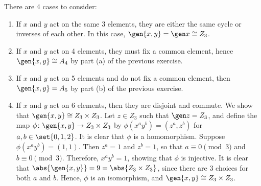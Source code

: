 \begin{sol}
    There are 4 cases to consider:
    \begin{enumerate}
        \item If $x$ and $y$ act on the same 3 elements, they are either the same cycle or inverses of each other.
		In this case, $\gen{x, y} = \gen x \cong Z_3$.
        \item If $x$ and $y$ act on 4 elements, they must fix a common element, hence $\gen{x, y} \cong A_4$ by part (a) of the previous exercise.
        \item If $x$ and $y$ act on 5 elements and do not fix a common element, then $\gen{x, y} = A_5$ by part (b) of the previous exercise.
        \item If $x$ and $y$ act on 6 elements, then they are disjoint and commute.
		We show that $\gen{x, y} \cong Z_3 \times Z_3$.
		Let $z \in Z_3$ such that $\gen z = Z_3$, and define the map $\phi \colon \gen{x, y} \to Z_3 \times Z_3$ by $\phi(x^a y^b) = (z^a, z^b)$ for $a, b \in \set{0, 1, 2}$.
		It is clear that $\phi$ is a homomorphism.
		Suppose $\phi(x^a y^b) = (1, 1)$.
		Then $z^a = 1$ and $z^b = 1$, so that $a \equiv 0 \pmod 3$ and $b \equiv 0 \pmod 3$.
		Therefore, $x^a y^b = 1$, showing that $\phi$ is injective.
		It is clear that $\abs{\gen{x, y}} = 9 = \abs{Z_3 \times Z_3}$, since there are 3 choices for both $a$ and $b$.
		Hence, $\phi$ is an isomorphism, and $\gen{x, y} \cong Z_3 \times Z_3$. \qedhere
    \end{enumerate}
\end{sol}